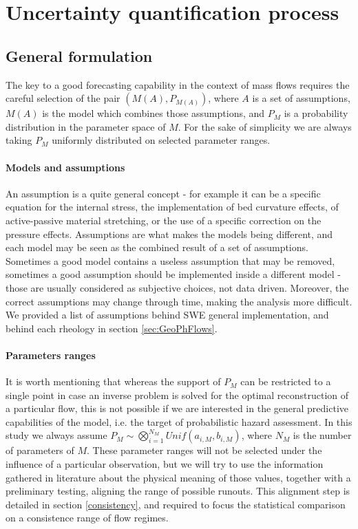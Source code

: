 \documentclass{article}
\begin{document}
\section{Uncertainty quantification process}
\subsection{General formulation}
The key to a good forecasting capability in the context of mass flows requires the careful selection of the pair $\left(M(A), P_{M(A)}\right)$, where $A$ is a set of assumptions, $M(A)$ is the model which combines those assumptions, and $P_M$ is a probability distribution in the parameter space of $M$. For the sake of simplicity we are always taking $P_M$ uniformly distributed on selected parameter ranges.

\paragraph{Models and assumptions} An assumption is a quite general concept - for example it can be a specific equation for the internal stress, the implementation of bed curvature effects, of active-passive material stretching, or the use of a specific correction on the pressure effects. Assumptions are what makes the models being different, and each model may be seen as the combined result of a set of assumptions. Sometimes a good model contains a useless assumption that may be removed, sometimes a good assumption should be implemented inside a different model - those are usually considered as subjective choices, not data driven. Moreover, the correct assumptions may change through time, making the analysis more difficult. We provided a list of assumptions behind SWE general implementation, and behind each rheology in section \ref{sec:GeoPhFlows}.

\paragraph{Parameters ranges} It is worth mentioning that whereas the support of $P_M$ can be restricted to a single point in case an inverse problem is solved for the optimal reconstruction of a particular flow, this is not possible if we are interested in the general predictive capabilities of the model, i.e. the target of probabilistic hazard assessment. In this study we always assume $P_M\sim \bigotimes_{i=1}^{N_M} Unif(a_{i,M},b_{i,M})$, where $N_M$ is the number of parameters of $M$. These parameter ranges will not be selected under the influence of a particular observation, but we will try to use the information gathered in literature about the physical meaning of those values, together with a preliminary testing, aligning the range of possible runouts. This alignment step is detailed in section \ref{consistency}, and required to focus the statistical comparison on a consistence range of flow regimes.
\end{document}
